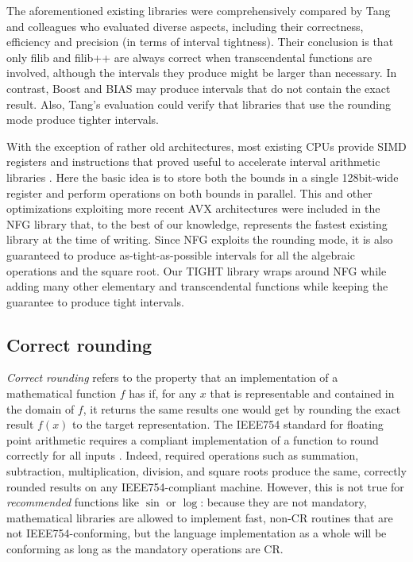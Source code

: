 The aforementioned existing libraries were comprehensively compared by Tang and colleagues \cite{tang2022} who evaluated diverse aspects, including their correctness, efficiency and precision (in terms of interval tightness). Their conclusion is that only filib and filib++ are always correct when transcendental functions are involved, although the intervals they produce might be larger than necessary. In contrast, Boost and BIAS may produce intervals that do not contain the exact result. Also, Tang's evaluation could verify that libraries that use the rounding mode produce tighter intervals.

With the exception of rather old architectures, most existing CPUs provide SIMD registers and instructions that proved useful to accelerate interval arithmetic libraries \cite{lambov2008}. Here the basic idea is to store both the bounds in a single 128bit-wide register and perform operations on both bounds in parallel. This and other optimizations exploiting more recent AVX architectures were  included in the NFG library \cite{nfg} that, to the best of our knowledge, represents the fastest existing library at the time of writing. Since NFG exploits the rounding mode, it is also guaranteed to produce as-tight-as-possible intervals for all the algebraic operations and the square root. Our TIGHT library wraps around NFG while adding many other elementary and transcendental functions while keeping the guarantee to produce tight intervals.

\subsection{Correct rounding}
\emph{Correct rounding} refers to the property that an implementation
of a mathematical function $f$ has if, for any $x$ that is representable and contained in the domain of $f$, it returns the same results one would get by rounding the exact result $f(x)$ to the target representation.
The IEEE754 standard for floating point arithmetic requires a compliant implementation of a function to round correctly for all inputs \cite{ieee}. Indeed, required operations such as summation, subtraction, multiplication, division, and square roots produce the same, correctly rounded results on any IEEE754-compliant machine.
However, this is not true for \emph{recommended} functions like $\sin$ or $\log$: because they are not mandatory, mathematical libraries are allowed to implement fast, non-CR routines that are not IEEE754-conforming, but the language implementation as a whole will be conforming as long as the mandatory operations are CR.

